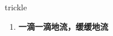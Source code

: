 
\begin{frame}
{\huge trickle}
\begin{center}
\begin{enumerate}\Large
  \item \textbf{一滴一滴地流，缓缓地流}
\end{enumerate}
\end{center}
\end{frame}
